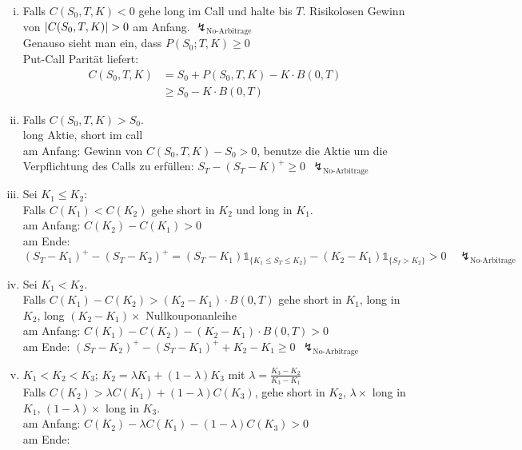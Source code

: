 \begin{enumerate}[(i)]
	\item Falls $C(S_0,T,K) < 0$ gehe long im Call und halte bis $T$. Risikolosen Gewinn von $\left\vert C(S_0,T,K)\right\vert> 0$ am Anfang. $\lightning_{\text{No-Arbitrage}}$\\
	Genauso sieht man ein, dass $P(S_0;T,K)\ge 0$\\
	Put-Call Parität liefert:
	\begin{equation*}
		\begin{aligned}
			C(S_0,T,K)&=S_0 + P(S_0,T,K)-K\cdot B(0,T)\\
			&\ge S_0 - K\cdot B(0,T)
		\end{aligned}
	\end{equation*}
	\item  Falls $C(S_0,T,K) >S_0$.\\
	long Aktie, short im call\\
	am Anfang: Gewinn von $C(S_0,T,K) -S_0>0$, benutze die Aktie um die Verpflichtung des Calls zu erfüllen: $S_T - (S_T-K)^+ \ge 0~~\lightning_{\text{No-Arbitrage}}$
	\item Sei $K_1 \le K_2$:\\
	Falls $C(K_1)<C(K_2)$ gehe  short in $K_2$ und long in $K_1$.\\
	am Anfang: $C(K_2) - C(K_1) > 0$\\
	am Ende: 
	\[
	(S_T-K_1)^+ -(S_T-K_2)^+ = (S_T-K_1)\mathbb{1}_{\{K_1\le S_T\le K_2\}}-(K_2-K_1)\mathbb{1}_{\{S_T>K_2\}}>0\quad \lightning_{\text{No-Arbitrage}}
	\]
	\item Sei $K_1<K_2$.\\
	Falls $C(K_1)-C(K_2)>(K_2-K_1)\cdot B(0,T)$ gehe short in $K_1$, long in $K_2$, long $(K_2-K_1)\times$ Nullkouponanleihe\\ 
	am Anfang: $C(K_1)-C(K_2)-(K_2-K_1)\cdot B(0,T)>0$\\
	am Ende: $(S_T-K_2)^+ -(S_T-K_1)^+ +K_2-K_1 \ge 0~~ \lightning_{\text{No-Arbitrage}}$
	\item $K_1<K_2<K_3$; $K_2=\lambda K_1+(1-\lambda)K_3$ mit $\lambda=\frac{K_3-K_2}{K_3-K_1}$\\
	Falls $C(K_2)> \lambda C(K_1)+ (1-\lambda)C(K_3)$, gehe short in $K_2$, $\lambda \times$ long in $K_1$, $(1-\lambda) \times$ long in $K_3$.\\
	am Anfang: $C(K_2)-\lambda C(K_1)-(1-\lambda)C(K_3)>0$\\
	am Ende: 
	\begin{equation*}
	\begin{aligned}

\end{aligned}
\end{equation*}
\end{enumerate}
